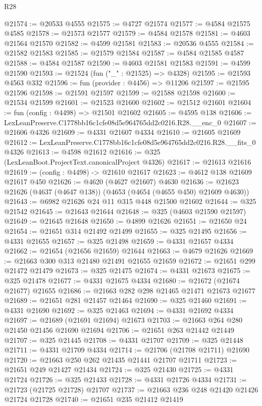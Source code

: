 \begin{lexlean}{R28}
\begin{coremodule}
@21574 := @20533 @4555
@21575 := @4727 @21574
@21577 := @4584 @21575 @4585
@21578 := @21573 @21577
@21579 := @4584 @21578
@21581 := @4603 @21564 @21570
@21582 := @4599 @21581
@21583 := @20536 @4555
@21584 := @21582 @21583
@21585 := @21579 @21584
@21587 := @4584 @21585 @4587
@21588 := @4584 @21587
@21590 := @4603 @21581 @21583
@21591 := @4599 @21590
@21593 := @21524 (fun ("_" : @21525) => @4328)
@21595 := @21593 @4563 @332
@21596 := fun (provider : @4456) => @11206
@21597 := @21595 @21596
@21598 := @21591 @21597
@21599 := @21588 @21598
@21600 := @21534 @21599
@21601 := @21523 @21600
@21602 := @21512 @21601
@21604 := fun (config : @4498) => @21501 @21602
@21605 := @4595 @138
@21606 := LexLeanPreserve.C1778bb16c1cfe08d5e964765dd2c0216.R28.__enc_0
@21607 := @21606 @4326
@21609 := @4331 @21607 @4334
@21610 := @21605 @21609
@21612 := LexLeanPreserve.C1778bb16c1cfe08d5e964765dd2c0216.R28.__fits_0 @4326
@21613 := @4598 @21612
@21616 := @325 (LexLeanBoot.ProjectText.canonicalProject @4326)
@21617 := @21613 @21616
@21619 := (config : @4498) -> @21610 @21617
@21623 := @4612 @138 @21609 @21617 @450
@21626 := @4620 (@4627 @21607) @4630
@21636 := @21623 @21626 (@4637 (@4647 @138)) (@4653 (@4654 (@4655 @450) @21609 @4630))
@21643 := @6982 @21626 @24 @11 @315 @448 @21500 @21602
@21644 := @325 @21542
@21645 := @21643 @21644
@21648 := @325 (@4603 @21590 @21597)
@21649 := @21645 @21648
@21650 := @4899 @21626
@21651 := @21650 @24
@21654 := @21651 @314 @21492 @21499
@21655 := @325 @21495
@21656 := @4331 @21655
@21657 := @325 @21498
@21659 := @4331 @21657 @4334
@21662 := @21654 (@21656 @21659) @21644
@21663 := @4679 @21626
@21669 := @21663 @300 @313 @21480 @21491 @21655 @21659
@21672 := @21651 @299 @21472 @21479
@21673 := @325 @21475
@21674 := @4331 @21673
@21675 := @325 @21478
@21677 := @4331 @21675 @4334
@21680 := @21672 (@21674 @21677) @21655
@21686 := @21663 @282 @298 @21465 @21471 @21673 @21677
@21689 := @21651 @281 @21457 @21464
@21690 := @325 @21460
@21691 := @4331 @21690
@21692 := @325 @21463
@21694 := @4331 @21692 @4334
@21697 := @21689 (@21691 @21694) @21673
@21703 := @21663 @264 @280 @21450 @21456 @21690 @21694
@21706 := @21651 @263 @21442 @21449
@21707 := @325 @21445
@21708 := @4331 @21707
@21709 := @325 @21448
@21711 := @4331 @21709 @4334
@21714 := @21706 (@21708 @21711) @21690
@21720 := @21663 @250 @262 @21435 @21441 @21707 @21711
@21723 := @21651 @249 @21427 @21434
@21724 := @325 @21430
@21725 := @4331 @21724
@21726 := @325 @21433
@21728 := @4331 @21726 @4334
@21731 := @21723 (@21725 @21728) @21707
@21737 := @21663 @236 @248 @21420 @21426 @21724 @21728
@21740 := @21651 @235 @21412 @21419

\end{coremodule}
\end{lexlean}
